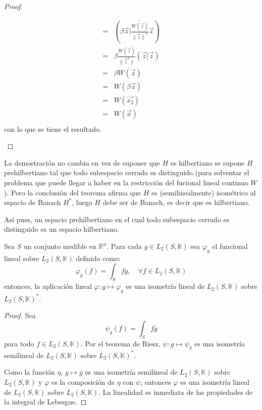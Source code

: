 \documentclass[12pt]{report}
\theoremstyle{largebreak}
\newcommand\norm[1]{\ensuremath{\|#1\|}}
\newcommand\pint[2]{\ensuremath{\left(#1\big| #2\right)}}
\newcommand\conj[1]{\ensuremath{\overline{#1}}}
\begin{document}
\begin{proof}
\begin{enumerate}
\begin{equation*}
\begin{split}
                    =&\pint{\beta\vec{z}}{\conj{\frac{W(\vec{z})}{\norm{\vec{z}}^2}}\vec{z}} \\
                    =&\beta\frac{W(\vec{z})}{\norm{\vec{z}^2}}\pint{\vec{z}}{\vec{z}} \\
                    =&\beta W(\vec{z}) \\
                    =&W(\beta\vec{z}) \\
                    =&W(\vec{x_2}) \\
                    =&W(\vec{x}) \\
                \end{split}
            \end{equation*}
            con lo que se tiene el resultado.

        \end{enumerate}
    \end{proof}

    \begin{obs}
        La demostración no cambia en vez de suponer que $H$ es hilbertiano se supone $H$ prehilbertiano tal que todo subespacio cerrado es distinguido (para solventar el problema que puede llegar a haber en la restricción del fucional lineal continuo $W$). Pero la conclusión del teorema afirma que $H$ es (semilinealmente) isométrico al espacio de Banach $H^*$, luego $H$ debe ser de Banach, es decir que es hilbertiano.

        Así pues, un espacio prehilbertiano en el cual todo subespacio cerrado es distinguido es un espacio hilbertiano. 
    \end{obs}

    \begin{propo}[Autodualidad de $L_2$]
        Sea $S$ un conjunto medible en $\mathbb{R}^n$. Para cada $g\in L_2(S,\mathbb{K})$ sea $\varphi_g$ el funcional lineal sobre $L_2(S,\mathbb{K})$ definido como:
        \begin{equation*}
            \varphi_g(f)=\int_Sfg, \quad\forall f\in L_2(S,\mathbb{K})
        \end{equation*}
        entonces, la aplicación lineal $\varphi:g\mapsto \varphi_g$ es una isometría lineal de $L_2(S,\mathbb{K})$ sobre $L_2(S,\mathbb{K})^*$.
    \end{propo}

    \begin{proof}
        Sea $$\psi_g(f)=\int_S f\conj{g}$$ para todo $f\in L_2(S,\mathbb{K})$. Por el teorema de Riesz, $\psi:g\mapsto\psi_g$ es una isometría semilineal de $L_2(S,\mathbb{K})$ sobre $L_2(S,\mathbb{K})^*$.

        Como la función $\eta$, $g\mapsto\conj{g}$ es una isometría semilineal de $L_2(S,\mathbb{K})$ sobre $L_2(S,\mathbb{K})$ y $\varphi$ es la composición de $\eta$ con $\psi$, entonces $\varphi$ es una isometría lineal de $L_2(S,\mathbb{K})$ sobre $L_2(S,\mathbb{K})$. La linealidad es inmediata de las propiedades de la integral de Lebesgue.

    \end{proof}
\end{document}
